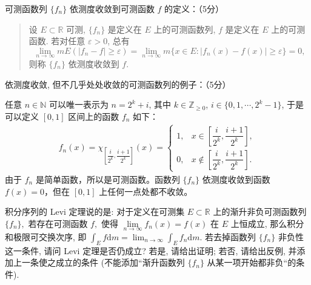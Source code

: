 \begin{solution}
  可测函数列 \(\{f_n\}\) 依测度收敛到可测函数 \(f\) 的定义：（5分）

  \begin{quote}
  设 \(E \subset \mathbb{R}\) 可测, \(\{f_n\}\) 是定义在 \(E\) 上的可测函数列, \(f\) 是定义在 \(E\) 上的可测函数. 若对任意 \(\varepsilon > 0\), 总有
  \[\lim\limits_{n\to\infty} m E (\lvert f_n - f \rvert \geqslant \varepsilon) = \lim\limits_{n\to\infty} m \{ x \in E \colon \lvert f_n(x) - f(x) \rvert \geqslant \varepsilon \} = 0,\]
  则称 \(\{f_n\}\) 依测度收敛到 \(f\).
  \end{quote}

  依测度收敛, 但不几乎处处收敛的可测函数列的例子：（5分）

  任意 \(n \in \mathbb{N}\) 可以唯一表示为 \(n = 2^k + i\), 其中 \(k \in \mathbb{Z}_{\geqslant 0}\), \(i \in \{0, 1, \cdots, 2^k - 1\}\), 于是可以定义 \([0, 1]\) 区间上的函数 \(f_n\) 如下：
  \[\begin{aligned}
  f_n(x) = \chi_{\left[ \dfrac{i}{2^k}, \dfrac{i+1}{2^k} \right]}(x) = \begin{cases}
    1, & x \in \left[ \dfrac{i}{2^k}, \dfrac{i+1}{2^k} \right], \\
    0, & x \notin \left[ \dfrac{i}{2^k}, \dfrac{i+1}{2^k} \right].
  \end{cases}
  \end{aligned}\]
  由于 \(f_n\) 是简单函数，所以是可测函数。函数列 \(\{f_n\}\) 依测度收敛到函数 \(f(x) = 0\)，但在 \([0, 1]\) 上任何一点处都不收敛。
\end{solution}

\begin{question}[points = 10]
  积分序列的 Levi 定理说的是: 对于定义在可测集 $E \subset \mathbb{R}$ 上的渐升非负可测函数列 $\{f_n\},$ 若存在可测函数 $f,$ 使得 $\lim\limits_{n\to\infty} f_n(x) = f(x)$ 在 $E$ 上恒成立, 那么积分和极限可交换次序, 即 $\displaystyle \int_E f \mathrm{d} m = \lim_{n \to \infty} \int_E f_n \mathrm{d} m.$ 若去掉函数列 $\{f_n\}$ 非负性这一条件, 请问 Levi 定理是否仍成立? 若是, 请给出证明; 若否, 请给出反例, 并添加上一条使之成立的条件 (不能添加“渐升函数列 $\{f_n\}$ 从某一项开始都非负“的条件).

\end{question}

